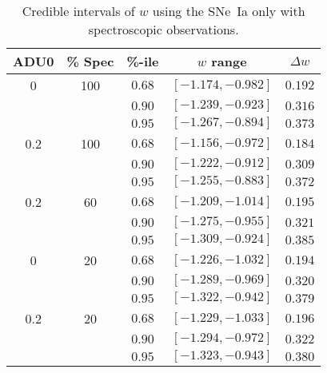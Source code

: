 \documentclass[preprint]{aastex}
\begin{document}
\begin{table}
\centering
\begin{tabular}{cc|c|cc|}
\hline
ADU0&\% Spec&\%-ile & $w$ range & $\Delta w$\\ \hline
0 & 100 &$0.68$ & $[-1.174, -0.982]$ & $0.192$ \\
&&$0.90$ & $[-1.239, -0.923]$ & $0.316$ \\
&&$0.95$ & $[-1.267, -0.894]$ & $0.373$ \\ \hline
0.2 & 100&$0.68$ & $[-1.156, -0.972]$ & $0.184$ \\
&&$0.90$ & $[-1.222, -0.912]$ & $0.309$ \\
&&$0.95$ & $[-1.255, -0.883]$ & $0.372$ \\ \hline
0.2&60&$0.68$ & $[-1.209, -1.014]$ & $0.195$ \\
&&$0.90$ & $[-1.275, -0.955]$ & $0.321$ \\
&&$0.95$ & $[-1.309, -0.924]$ & $0.385$ \\ \hline
0&20&$0.68$ & $[-1.226, -1.032]$ & $0.194$ \\
&&$0.90$ & $[-1.289, -0.969]$ & $0.320$ \\
&&$0.95$ & $[-1.322, -0.942]$ & $0.379$ \\ \hline
0.2& 20&$0.68$ & $[-1.229, -1.033]$ & $0.196$ \\
&&$0.90$ & $[-1.294, -0.972]$ & $0.322$ \\
&&$0.95$ & $[-1.323, -0.943]$ & $0.380$ \\
\hline
\end{tabular}
\caption{Credible intervals of $w$ using the SNe~Ia only with spectroscopic
observations.\label{ia_only:tab}}
\end{table}
\end{document}
